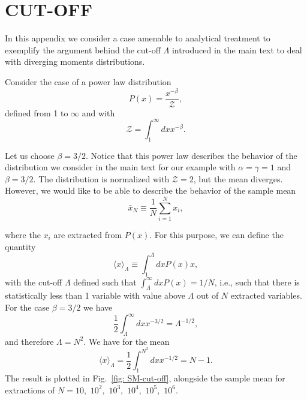 \documentclass[
 pre,
 twocolumn,
 amsmath,
 amssymb,
 aps,
]{revtex4-2}
\begin{document}
\appendix

\section{CUT-OFF}
\label{appendix a}
In this appendix we consider a case amenable to analytical treatment to exemplify the argument behind the cut-off $\Lambda$ introduced in the main text to deal with diverging moments distributions.

Consider the case of a power law distribution 
\begin{equation}
  P(x)=\frac{x^{-\beta}}{\mathcal{Z}} ,
\end{equation}
defined from 1 to $\infty$ and with 
\begin{equation}
  \mathcal{Z}=\int_1^{\infty}dxx^{-\beta}.  
\end{equation}

Let us choose $\beta=3/2$. Notice that this power law describes the behavior of the distribution we consider in the main text for our example with $\alpha=\gamma=1$ and $\beta=3/2$.
The distribution is normalized with $\mathcal{Z}=2$, but the mean diverges. However, we would like to be able to describe the behavior of the sample mean 
\begin{equation}
  \bar{x}_N\equiv\frac{1}{N}\sum_{i=1}^Nx_i,
\end{equation}

where the $x_i$ are extracted from $P(x)$.
For this purpose, we can define the quantity
\begin{equation}
  \langle x\rangle_{\Lambda}\equiv\int_1^{\Lambda}dxP(x)x,
\end{equation}
with the cut-off $\Lambda$ defined such that $\int_{\Lambda}^{\infty}dxP(x)=1/N$, i.e., such that there is statistically less than 1 variable with value above $\Lambda$ out of $N$ extracted variables. For the case $\beta=3/2$ we have 
\begin{equation}
  \frac{1}{2}\int_{\Lambda}^{\infty}dxx^{-3/2}=\Lambda^{-1/2},
\end{equation}
and therefore $\Lambda=N^2$. We have for the mean
\begin{equation}
  \langle x\rangle_{\Lambda}=\frac{1}{2}\int_1^{N^2}dxx^{-1/2} = N-1.
  \label{eq: SM-sample-mean}
\end{equation}
The result is plotted in Fig.~\ref{fig: SM-cut-off}, alongside the sample mean for extractions of $N=10,$ $10^2,$ $10^3,$ $10^4,$ $10^5,$ $10^6$.
\end{document}
